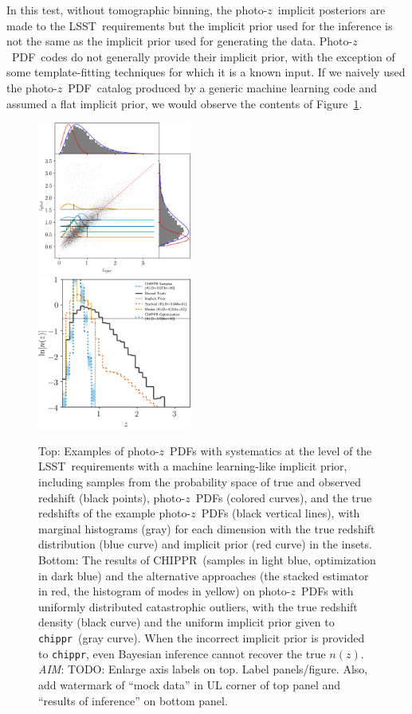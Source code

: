 \documentclass[iop]{emulateapj}
\newcommand{\todo}[3]{{\color{#2}\emph{#1}: #3}}
\newcommand{\aim}[1]{\todo{AIM}{red}{#1}}
\newcommand{\Fig}[1]{Figure~\ref{#1}}
\newcommand{\project}[1]{\textsc{#1}}
\newcommand{\lsst}{\project{LSST}}
\newcommand{\Chippr}{\project{CHIPPR}}%
\newcommand{\repo}[1]{\texttt{#1}}
\newcommand{\chippr}{\repo{chippr}}
\newcommand{\pz}{photo-$z$}
\newcommand{\Pz}{Photo-$z$}
\newcommand{\pzpdf}{\pz\ PDF}%
\newcommand{\Pzpdf}{\Pz\ PDF}%
\newcommand{\pzip}{\pz\ implicit posterior}
\newcommand{\nz}{$n(z)$}
\begin{document}
In this test, without tomographic binning, the \pzip s are made to the \lsst\ requirements but the implicit prior used for the inference is not the same as the implicit prior used for generating the data.
\Pzpdf\ codes do not generally provide their implicit prior, with the exception of some template-fitting techniques for which it is a known input.
If we naively used the \pzpdf\ catalog produced by a generic machine learning code and assumed a flat implicit prior, we would observe the contents of \Fig{fig:mischaracterized}.

\begin{figure}
	\begin{center}
		\includegraphics[width=0.45\textwidth]{figures/chippr/misspecified_mega_scatter.png}\\
		\includegraphics[width=0.45\textwidth]{figures/chippr/misspecified_log_estimators.png}
		\caption{
			Top: Examples of \pzpdf s with systematics at the level of the \lsst\ requirements with a machine learning-like implicit prior, including samples from the probability space of true and observed redshift (black points), \pzpdf s (colored curves), and the true redshifts of the example \pzpdf s (black vertical lines), with marginal histograms (gray) for each dimension with the true redshift distribution (blue curve) and implicit prior (red curve) in the insets.
			Bottom: The results of \Chippr\ (samples in light blue, optimization in dark blue) and the alternative approaches (the stacked estimator in red, the histogram of modes in yellow) on \pzpdf s with uniformly distributed catastrophic outliers, with the true redshift density (black curve) and the uniform implicit prior given to \chippr\ (gray curve).
			When the incorrect implicit prior is provided to \chippr, even Bayesian inference cannot recover the true \nz.
			\aim{TODO: Enlarge axis labels on top.
			Label panels/figure.
			Also, add watermark of ``mock data'' in UL corner of top panel and ``results of inference'' on bottom panel.}
		}
		\label{fig:mischaracterized}
	\end{center}
\end{figure}
\end{document}
